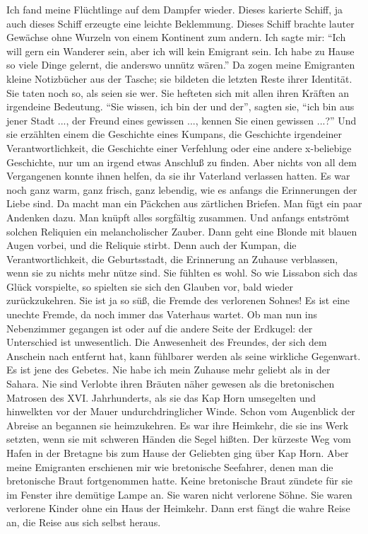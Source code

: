 \documentclass[12pt,ngerman,parskip=half,draft]{scrartcl}
\begin{document}
Ich fand meine Flüchtlinge auf dem Dampfer wieder. Dieses karierte Schiff, ja auch dieses Schiff erzeugte eine leichte Beklemmung. Dieses Schiff brachte lauter Gewächse ohne Wurzeln von einem Kontinent zum andern. Ich sagte mir: \enquote{Ich will gern ein Wanderer sein, aber ich will kein Emigrant sein. Ich habe zu Hause so viele Dinge gelernt, die anderswo unnütz wären.} Da zogen meine Emigranten kleine Notizbücher aus der Tasche; sie bildeten die letzten Reste ihrer Identität. Sie taten noch so, als seien sie wer. Sie hefteten sich mit allen ihren Kräften an irgendeine Bedeutung. \enquote{Sie wissen, ich bin der und der}, sagten sie, \enquote{ich bin aus jener Stadt ..., der Freund eines gewissen ..., kennen Sie einen gewissen ...?} Und sie erzählten einem die Geschichte eines Kumpans, die Geschichte irgendeiner Verantwortlichkeit, die Geschichte einer Verfehlung oder eine andere x-beliebige Geschichte, nur um an irgend etwas Anschluß zu finden. Aber nichts von all dem Vergangenen konnte ihnen helfen, da sie ihr Vaterland verlassen hatten. Es war noch ganz warm, ganz frisch, ganz lebendig, wie es anfangs die Erinnerungen der Liebe sind. Da macht man ein Päckchen aus zärtlichen Briefen. Man fügt ein paar Andenken dazu. Man knüpft alles sorgfältig zusammen. Und anfangs entströmt solchen Reliquien ein melancholischer Zauber. Dann geht eine Blonde mit blauen Augen vorbei, und die Reliquie stirbt. Denn auch der Kumpan, die Verantwortlichkeit, die Geburtsstadt, die Erinnerung an Zuhause verblassen, wenn sie zu nichts mehr nütze sind. Sie fühlten es wohl. So wie Lissabon sich das Glück vorspielte, so spielten sie sich den Glauben vor, bald wieder zurückzukehren. Sie ist ja so süß, die Fremde des verlorenen Sohnes! Es ist eine unechte Fremde, da noch immer das Vaterhaus wartet. Ob man nun ins Nebenzimmer gegangen ist oder auf die andere Seite der Erdkugel: der Unterschied ist unwesentlich. Die Anwesenheit des Freundes, der sich dem Anschein nach entfernt hat, kann fühlbarer werden als seine wirkliche Gegenwart. Es ist jene des Gebetes. Nie habe ich mein Zuhause mehr geliebt als in der Sahara. Nie sind Verlobte ihren Bräuten näher gewesen als die bretonischen Matrosen des XVI. Jahrhunderts, als sie das Kap Horn umsegelten und hinwelkten vor der Mauer undurchdringlicher Winde. Schon vom Augenblick der Abreise an begannen sie heimzukehren. Es war ihre Heimkehr, die sie ins Werk setzten, wenn sie mit schweren Händen die Segel hißten. Der kürzeste Weg vom Hafen in der Bretagne bis zum Hause der Geliebten ging über Kap Horn. Aber meine Emigranten erschienen mir wie bretonische Seefahrer, denen man die bretonische Braut fortgenommen hatte. Keine bretonische Braut zündete für sie im Fenster ihre demütige Lampe an. Sie waren nicht verlorene Söhne. Sie waren verlorene Kinder ohne ein Haus der Heimkehr. Dann erst fängt die wahre Reise an, die Reise aus sich selbst heraus.
\end{document}
